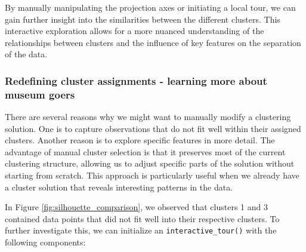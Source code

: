 \documentclass[article]{ajs}
\begin{document}
By manually manipulating the projection axes or initiating a local tour, we can gain further insight into the similarities between the different clusters. This interactive exploration allows for a more nuanced understanding of the relationships between clusters and the influence of key features on the separation of the data.


\subsubsection{Redefining cluster assignments - learning more about museum goers}

There are several reasons why we might want to manually modify a clustering solution. One is to capture observations that do not fit well within their assigned clusters. Another reason is to explore specific features in more detail. The advantage of manual cluster selection is that it preserves most of the current clustering structure, allowing us to adjust specific parts of the solution without starting from scratch. This approach is particularly useful when we already have a cluster solution that reveals interesting patterns in the data.


In Figure \ref{fig:silhouette_comparison}, we observed that clusters 1 and 3 contained data points that did not fit well into their respective clusters. To further investigate this, we can initialize an \texttt{interactive\_tour()} with the following components:
\end{document}
